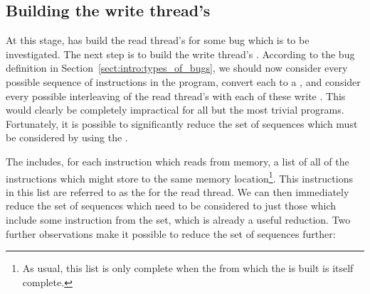 
\subsection{Building the write thread's \StateMachines}
\label{sect:derive:write_side}

At this stage, {\technique} has build the read thread's
{\StateMachine} for some bug which is to be investigated.  The next
step is to build the write thread's {\StateMachine}.  According to the
bug definition in Section~\ref{sect:intro:types_of_bugs}, we should
now consider every possible sequence of \backref{$\alpha$}
instructions in the program, convert each to a {\StateMachine}, and
consider every possible interleaving of the read thread's
{\StateMachine} with each of these write {\StateMachines}.  This would
clearly be completely impractical for all but the most trivial
programs.  Fortunately, it is possible to significantly reduce the set
of sequences which must be considered by using the .

The  includes, for each instruction which reads
from memory, a list of all of the instructions which might store to
the same memory location\footnote{As usual, this list is only complete
  when the  from which the  is built is itself complete.}.  This instructions in this
list are referred to as the  for the read
thread.  We can then immediately reduce the set of sequences which
need to be considered to just those which include some instruction
from the  set, which is already a useful
reduction.  Two further observations make it possible to reduce the
set of sequences further:

